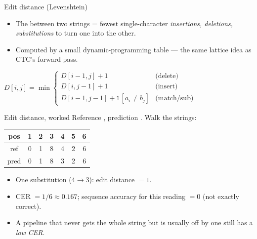 \documentclass[10pt,aspectratio=169]{beamer}
\begin{document}
\begin{frame}{Edit distance (Levenshtein)}
  \begin{itemize}
    \item The  between two strings = fewest single-character \emph{insertions, deletions, substitutions} to turn one into the other.
    \item Computed by a small dynamic-programming table --- the same lattice idea as CTC's forward pass.
  \end{itemize}
  \begin{mathbox}
    $\displaystyle D[i,j]=\min\begin{cases} D[i{-}1,j]+1 & \text{(delete)}\\ D[i,j{-}1]+1 & \text{(insert)}\\ D[i{-}1,j{-}1]+\mathbb{1}[a_i\neq b_j] & \text{(match/sub)}\end{cases}$
  \end{mathbox}
\end{frame}

\begin{frame}{Edit distance, worked}
  Reference , prediction . Walk the strings:
  \begin{center}
  \begin{tabular}{@{}ccccccc@{}}
    \toprule
    pos & 1 & 2 & 3 & 4 & 5 & 6 \\
    \midrule
    ref  & 0 & 1 & 8 & \alert{4} & 2 & 6 \\
    pred & 0 & 1 & 8 & \alert{3} & 2 & 6 \\
    \bottomrule
  \end{tabular}
  \end{center}
  \begin{itemize}
    \item One substitution ($4\!\to\!3$): edit distance $=1$.
    \item CER $= 1/6 \approx 0.167$; sequence accuracy for this reading $=0$ (not exactly correct).
    \item A pipeline that never gets the whole string but is usually off by one still has a \emph{low CER}.
  \end{itemize}
\end{frame}
\end{document}
